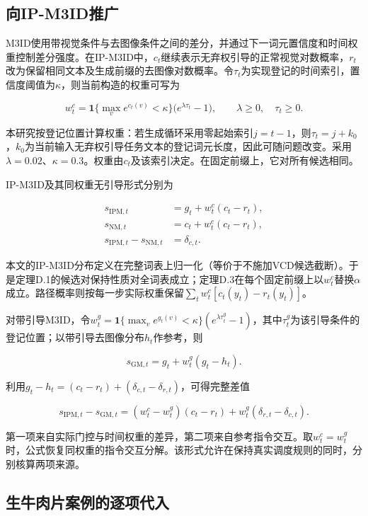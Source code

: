 \subsection{向IP-M3ID推广}\label{ux5411ip-m3idux63a8ux5e7f}

M3ID使用带视觉条件与去图像条件之间的差分，并通过下一词元置信度和时间权重控制差分强度\citep{favero2024m3id}。在IP-M3ID中，\(c_t\)继续表示无弃权引导的正常视觉对数概率，\(r_t\)改为保留相同文本及生成前缀的去图像对数概率。令\(\tau_t\)为实现登记的时间索引，置信度阈值为\(\kappa\)，则当前构造的权重可写为

\[
w_t^c
=\mathbf1\{\max_v e^{c_t(v)}<\kappa\}
\big(e^{\lambda\tau_t}-1\big),
\qquad
\lambda\geq0,\quad\tau_t\geq0.
\tag{D.49}
\]

本研究按登记位置计算权重：若生成循环采用零起始索引\(j=t-1\)，则\(\tau_t=j+k_0\)，\(k_0\)为当前输入无弃权引导任务文本的登记词元长度，因此可随问题改变。采用\(\lambda=0.02\)、\(\kappa=0.3\)。权重由\(c_t\)及该索引决定。在固定前缀上，它对所有候选相同。

IP-M3ID及其同权重无引导形式分别为

\[
\begin{aligned}
s_{\mathrm{IPM},t}&=g_t+w_t^c(c_t-r_t),\\
s_{\mathrm{NM},t}&=c_t+w_t^c(c_t-r_t),\\
s_{\mathrm{IPM},t}-s_{\mathrm{NM},t}&=\delta_{c,t}.
\end{aligned}
\tag{D.50}
\]

本文的IP-M3ID分布定义在完整词表上归一化（等价于不施加VCD候选截断）。于是定理D.1的候选对保持性质对全词表成立；定理D.3在每个固定前缀上以\(w_t^c\)替换\(\alpha\)成立。路径概率则按每一步实际权重保留\(\sum_t w_t^c[c_t(y_t)-r_t(y_t)]\)。

对带引导M3ID，令\(w_t^g=\mathbf1\{\max_v e^{g_t(v)}<\kappa\}(e^{\lambda\tau_t^g}-1)\)，其中\(\tau_t^g\)为该引导条件的登记位置；以带引导去图像分布\(h_t\)作参考，则

\[
s_{\mathrm{GM},t}=g_t+w_t^g(g_t-h_t).
\]

利用\(g_t-h_t=(c_t-r_t)+(\delta_{c,t}-\delta_{r,t})\)，可得完整差值

\[
\boxed{
s_{\mathrm{IPM},t}-s_{\mathrm{GM},t}
=(w_t^c-w_t^g)(c_t-r_t)
+w_t^g(\delta_{r,t}-\delta_{c,t}).
}
\tag{D.51}
\]

第一项来自实际门控与时间权重的差异，第二项来自参考指令交互。取\(w_t^c=w_t^g\)时，公式恢复同权重的指令交互分解。该形式允许在保持真实调度规则的同时，分别核算两项来源。

\subsection{生牛肉片案例的逐项代入}\label{ux751fux725bux8089ux7247ux6848ux4f8bux7684ux9010ux9879ux4ee3ux5165}

